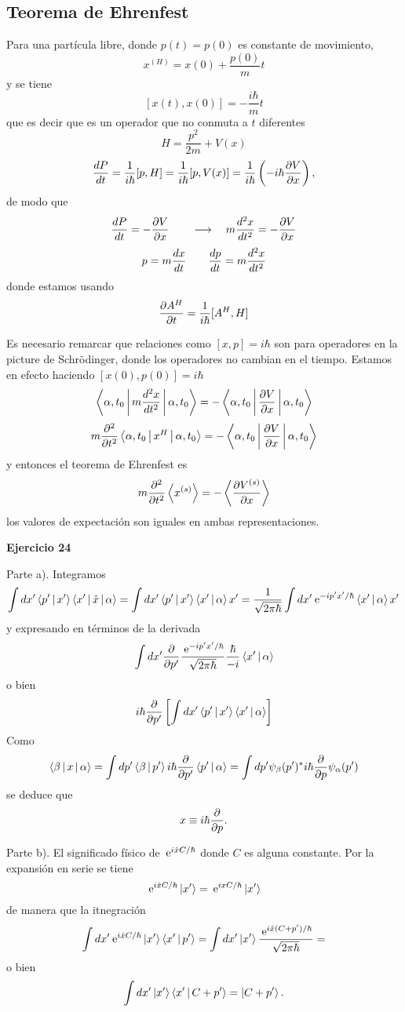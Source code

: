 \documentclass[10pt,oneside]{CBFT_book}
\begin{document}
\subsection{Teorema de Ehrenfest}

Para una partícula libre, donde $p(t)=p(0)$ es constante de movimiento,
\[
	x^{(H)} = x(0) + \frac{p(0)}{m}t
\]
y se tiene 
\[
	[x(t),x(0)] = -\frac{i\hbar}{m}t
\]
que es decir que es un operador que no conmuta a $t$ diferentes
\[
	H = \frac{p^2}{2m} + V(x)
\]
\[
	\dtot{P}{t} = \frac{1}{i\hbar}[p,H] = \frac{1}{i\hbar}[p,V(x)] = 
	\frac{1}{i\hbar}\left( -i\hbar\dpar{V}{x}\right),
\]
de modo que 
\[
	\dtot{P}{t} = -\dpar{V}{x} \qquad \longrightarrow \quad m \dtot[2]{x}{t} = -\dpar{V}{x} 
\]
\[
	p = m \dtot{x}{t} \qquad \dtot{p}{t} = m \dtot[2]{x}{t} 
\]
donde estamos usando 
\[
	\dpar{A^H}{t} = \frac{1}{i\hbar}[A^H,H]
\]

Es necesario remarcar que relaciones como $[x,p]=i\hbar$ son para operadores en la picture de Schrödinger, donde los 
operadores no cambian en el tiempo. Estamos en efecto haciendo $[x(0),p(0)]=i\hbar$
\[
	\Braket{\alpha,t_0|m \dtot[2]{x}{t}|\alpha,t_0} = - \Braket{\alpha,t_0|\dpar{V}{x}|\alpha,t_0}
\]
\[
	m\dpar[2]{}{t}\Braket{\alpha,t_0| x^H |\alpha,t_0} = -\Braket{\alpha,t_0|\dpar{V}{x}|\alpha,t_0}
\]
y entonces el teorema de Ehrenfest es 
\[
	m \dpar[2]{}{t} \Braket{x^{(s)}} = - \Braket{ \dpar{V^{(s)}}{x}}
\]
los valores de expectación son iguales en ambas representaciones.

\begin{ejemplo}{\bf Ejercicio 24}

Parte a). Integramos
\[
	\int dx' \Braket{p'|x'} \Braket{x'|\hat{x}|\a} = 
	\int dx' \Braket{p'|x'} \Braket{x'|\a} x' =
	\frac{1}{\sqrt{2\pi\hbar}} \int dx' \euler^{-i p' x' /\hbar } \Braket{x'|\a} x'
\]
y expresando en términos de la derivada
\[
	 \int dx' \dpar{}{p'}\frac{\euler^{-i p' x' /\hbar }}{\sqrt{2\pi\hbar}} \frac{\hbar}{-i} \Braket{x'|\a}
\]
o bien
\[
	i \hbar \dpar{}{p'} \left[ \int dx' \Braket{p'|x'} \Braket{x'|\a} \right]
\]
Como
\[
	\Braket{\b|x|\a} = \int dp' \Braket{\b|p'} i \hbar \dpar{}{p'} \Braket{p'|\a} =
	\int dp' \psi_\b(p')^* i \hbar \dpar{}{p} \psi_\a(p')
\]
se deduce que
\[
	x \equiv i \hbar \dpar{}{p}.
\]

Parte b). El significado físico de $\euler^{i \hat{x} C / \hbar }$ donde $C$ es alguna constante.
Por la expansión en serie se tiene
\[
	\euler^{i \hat{x} C / \hbar } \Ket{x'} = \euler^{i {x} C / \hbar } \Ket{x'}
\]
de manera que la itnegración 
\[
	\int dx' \euler^{i \hat{x} C / \hbar } \Ket{x'}\Braket{x'|p'} = 
	\int dx' \Ket{x'} \frac{ \euler^{i \hat{x} ( C + p' )/ \hbar } }{\sqrt{2\pi\hbar}} =
\]
o bien
\[
	\int dx' \Ket{x'}\Braket{x'|C+p'} = \Ket{C+p'}.
\]

 
\end{ejemplo}






\end{document}
